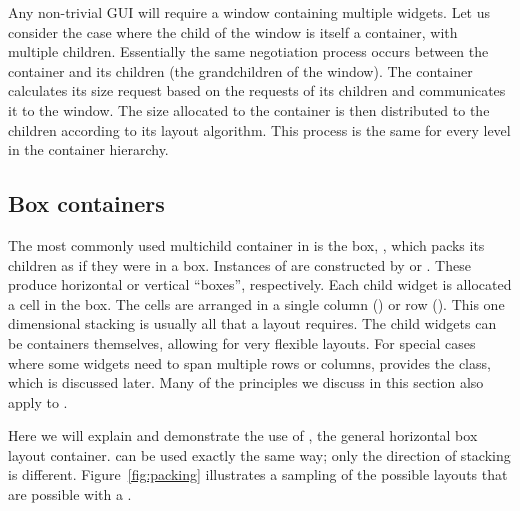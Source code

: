 Any non-trivial GUI will require a window containing multiple
widgets. Let us consider the case where the child of the window is
itself a container, with multiple children.  Essentially the same
negotiation process occurs between the container and its children (the
grandchildren of the window). The container calculates its size
request based on the requests of its children and communicates it to
the window. The size allocated to the container is then distributed to
the children according to its layout algorithm. This process is the
same for every level in the container hierarchy.

\subsection{Box containers}
\label{sec:RGtk2:layout:box}

The most commonly used multichild container in \GTK\/ is the box,
, which packs its children as if they were in a
box. Instances of  are constructed by 
or .  These produce horizontal or vertical
``boxes'', respectively. Each child widget is allocated a cell in the
box.  The cells are arranged in a single column () or
row (). This one dimensional stacking is usually all
that a layout requires. The child widgets can be containers
themselves, allowing for very flexible layouts. For special cases
where some widgets need to span multiple rows or columns, \GTK\/
provides the  class, which is discussed later.  Many
of the principles we discuss in this section also apply to
.

Here we will explain and demonstrate the use of , the
general horizontal box layout container.  can be used
exactly the same way; only the direction of stacking is different.
Figure~\ref{fig:packing} illustrates a sampling of the possible
layouts that are possible with a .


